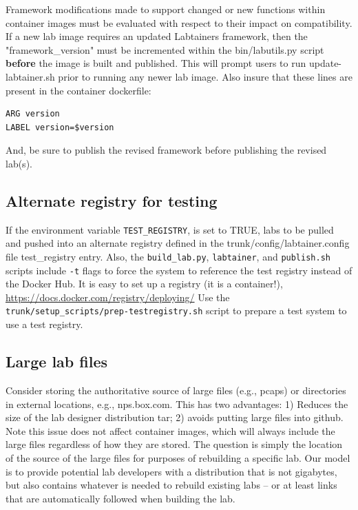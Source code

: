 \documentclass[12pt]{article}
\begin{document}
Framework modifications made to support changed or new functions within container images
must be evaluated with respect to their impact on compatibility. If a new lab image requires
an updated Labtainers framework, then the "framework\_version" must be incremented within the
bin/labutils.py script \textbf{before} the image is built and published.  This will prompt users
to run update-labtainer.sh prior to running any newer lab image. 
Also insure that these lines are present in the container dockerfile:
\begin{verbatim}
ARG version
LABEL version=$version
\end{verbatim}
\noindent And, be sure to publish the revised framework before publishing the revised lab(s).

\subsection{Alternate registry for testing}
If the environment variable {\tt TEST\_REGISTRY}, is set to TRUE, labs to be pulled and pushed
into an alternate registry defined in the trunk/config/labtainer.config file test\_registry entry.
Also, the {\tt build\_lab.py}, {\tt labtainer}, and {\tt publish.sh} scripts include {\tt -t} flags to
force the system to reference the test registry instead of the Docker Hub.
It is easy to set up a registry (it is a container!), \url{https://docs.docker.com/registry/deploying/}
Use the {\tt trunk/setup\_scripts/prep-testregistry.sh} script to
prepare a test system to use a test registry.

\subsection{Large lab files}
Consider storing the authoritative source of large files (e.g., pcaps) or directories in external locations, e.g., nps.box.com.  This has two
advantages:  1) Reduces the size of the lab designer distribution tar; 2) avoids putting large files
into github.  Note this issue does not affect container images, which will always include the large files regardless of how they
are stored.  The question is simply the location of the source of the large files for purposes of
rebuilding a specific lab.   Our model is to provide potential lab developers with a distribution that is not gigabytes, but also contains
whatever is needed to rebuild existing labs -- or at least links that are automatically followed when building the lab.
\end{document}
